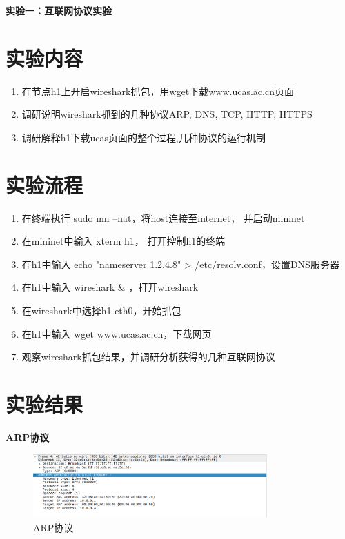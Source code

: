 \documentclass[11pt]{article}
\begin{document}


\begin{center}
  \LARGE \bf 实验一：互联网协议实验
\end{center}

\section{实验内容}

\begin{enumerate}
  \item 在节点h1上开启wireshark抓包，用wget下载www.ucas.ac.cn页面
  
  \item 调研说明wireshark抓到的几种协议ARP, DNS, TCP, HTTP, HTTPS
  
  \item   调研解释h1下载ucas页面的整个过程,几种协议的运行机制
  
\end{enumerate}

\section{实验流程}

\begin{enumerate}
  \item 在终端执行 sudo mn --nat，将host连接至internet， 并启动mininet
  \item 在mininet中输入 xterm h1， 打开控制h1的终端
  \item 在h1中输入 echo "nameserver 1.2.4.8" > /etc/resolv.conf，设置DNS服务器
  \item 在h1中输入 wireshark \& ，打开wireshark
  \item 在wireshark中选择h1-eth0，开始抓包
  \item 在h1中输入 wget www.ucas.ac.cn，下载网页
  \item 观察wireshark抓包结果，并调研分析获得的几种互联网协议
\end{enumerate}
\section{实验结果}

\textbf{ARP协议}

\begin{figure} [htbp]
  \centering
  \includegraphics[width=0.8\textwidth]{fig/arp.png}
  \caption{ARP协议}
  \label{fig:ARP}
\end{figure}
\end{document}
